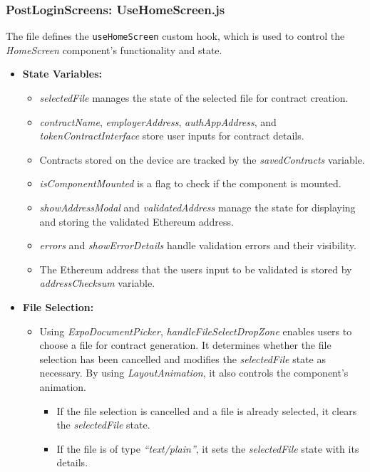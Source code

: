 \subsubsection{PostLoginScreens: UseHomeScreen.js}

The file defines the \texttt{useHomeScreen} custom hook, which is used to control the \textit{HomeScreen} component's functionality and state.

\begin{itemize}
    \item \textbf{State Variables:}
    \begin{itemize}
        \item \textit{selectedFile} manages the state of the selected file for contract creation.
        \item \textit{contractName}, \textit{employerAddress}, \textit{authAppAddress}, and \textit{tokenContractInterface} store user inputs for contract details.
        \item Contracts stored on the device are tracked by the \textit{savedContracts} variable.
        \item \textit{isComponentMounted} is a flag to check if the component is mounted.
        \item \textit{showAddressModal} and \textit{validatedAddress} manage the state for displaying and storing the validated Ethereum address.
        \item \textit{errors} and \textit{showErrorDetails} handle validation errors and their visibility.
        \item The Ethereum address that the users input to be validated is stored by \textit{addressChecksum} variable.
    \end{itemize}

    \item \textbf{File Selection:}
    \begin{itemize}
        \item Using \textit{ExpoDocumentPicker}, \textit{handleFileSelectDropZone} enables users to choose a file for contract generation. It determines whether the file selection has been cancelled and modifies the \textit{selectedFile} state as necessary. By using \textit{LayoutAnimation}, it also controls the component's animation.
        \begin{itemize}
            \item If the file selection is cancelled and a file is already selected, it clears the \textit{selectedFile} state.
            \item If the file is of type \textit{``text/plain''}, it sets the \textit{selectedFile} state with its details.
        \end{itemize}
    \end{itemize}


\end{itemize}

